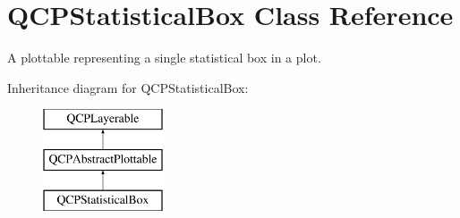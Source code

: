 \hypertarget{classQCPStatisticalBox}{\section{\-Q\-C\-P\-Statistical\-Box \-Class \-Reference}
\label{classQCPStatisticalBox}
}


\-A plottable representing a single statistical box in a plot.  


\-Inheritance diagram for \-Q\-C\-P\-Statistical\-Box\-:\begin{figure}[H]
\begin{center}
\leavevmode
\includegraphics[height=3.000000cm]{classQCPStatisticalBox}
\end{center}
\end{figure}

